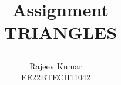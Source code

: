 \documentclass[journal,12pt,twocolumn]{IEEEtran}
\theoremstyle{remark}
\begin{document}
%




\vspace{3cm}

\title{
\Huge\ Assignment\\
\Huge\ TRIANGLES\\
\large\author{Rajeev Kumar \\EE22BTECH11042}
	
}	


%
%
%

% 
%



% 
\end{document}
